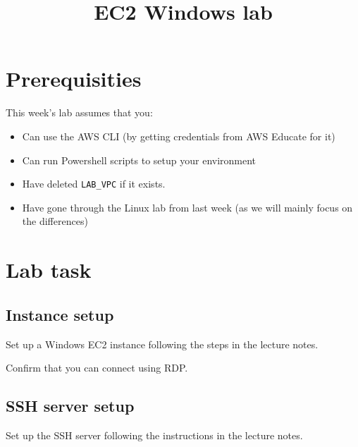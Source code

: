 \documentclass{pgnotes}
\title{EC2 Windows lab}
\begin{document}
\maketitle

\section{Prerequisities}

This week's lab assumes that you:
\begin{itemize}
\item Can use the AWS CLI (by getting credentials from AWS Educate for it)
\item Can run Powershell scripts to setup your environment
\item Have deleted \texttt{LAB\_VPC} if it exists.
\item Have gone through the Linux lab from last week (as we will mainly focus on the differences)
\end{itemize}

\section{Lab task}

\subsection{Instance setup}

Set up a Windows EC2 instance following the steps in the lecture notes. 

Confirm that you can connect using RDP. 

\subsection{SSH server setup}

Set up the SSH server following the instructions in the lecture notes. 
\end{document}
